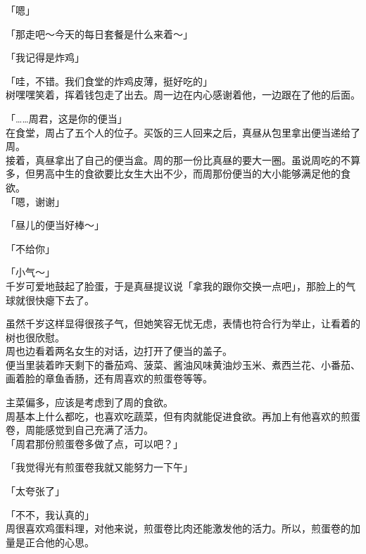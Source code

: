 「嗯」

「那走吧～今天的每日套餐是什么来着～」

「我记得是炸鸡」

「哇，不错。我们食堂的炸鸡皮薄，挺好吃的」\\

树嘿嘿笑着，挥着钱包走了出去。周一边在内心感谢着他，一边跟在了他的后面。\\

\vspace{2\baselineskip}

「……周君，这是你的便当」\\

在食堂，周占了五个人的位子。买饭的三人回来之后，真昼从包里拿出便当递给了周。\\

接着，真昼拿出了自己的便当盒。周的那一份比真昼的要大一圈。虽说周吃的不算多，但男高中生的食欲要比女生大出不少，而周那份便当的大小能够满足他的食欲。\\

「嗯，谢谢」

「昼儿的便当好棒～」

「不给你」

「小气～」\\

千岁可爱地鼓起了脸蛋，于是真昼提议说「拿我的跟你交换一点吧」，那脸上的气球就很快瘪下去了。

虽然千岁这样显得很孩子气，但她笑容无忧无虑，表情也符合行为举止，让看着的树也很欣慰。\\

周也边看着两名女生的对话，边打开了便当的盖子。\\

便当里装着昨天剩下的番茄鸡、菠菜、酱油风味黄油炒玉米、煮西兰花、小番茄、画着脸的章鱼香肠，还有周喜欢的煎蛋卷等等。

主菜偏多，应该是考虑到了周的食欲。\\

周基本上什么都吃，也喜欢吃蔬菜，但有肉就能促进食欲。再加上有他喜欢的煎蛋卷，周能感觉到自己充满了活力。\\

「周君那份煎蛋卷多做了点，可以吧？」

「我觉得光有煎蛋卷我就又能努力一下午」

「太夸张了」

「不不，我认真的」\\

周很喜欢鸡蛋料理，对他来说，煎蛋卷比肉还能激发他的活力。所以，煎蛋卷的加量是正合他的心思。\\

